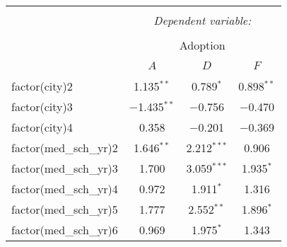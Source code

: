 \documentclass[11pt]{article}
\begin{document}
\begin{table}[!htbp] \centering 
  \caption{} 
  \label{} 
\begin{tabular}{@{\extracolsep{5pt}}lccc} 
\\[-1.8ex]\hline 
\hline \\[-1.8ex] 
 & \multicolumn{3}{c}{\textit{Dependent variable:}} \\ 
\cline{2-4} 
\\[-1.8ex] & \multicolumn{3}{c}{Adoption} \\ 
\\[-1.8ex] & $A$ & $D$ & $F$\\ 
\hline \\[-1.8ex] 
 factor(city)2 & 1.135$^{**}$ & 0.789$^{*}$ & 0.898$^{**}$ \\ 
  factor(city)3 & $-$1.435$^{**}$ & $-$0.756 & $-$0.470 \\ 
  factor(city)4 & 0.358 & $-$0.201 & $-$0.369 \\ 
  factor(med\_sch\_yr)2 & 1.646$^{**}$ & 2.212$^{***}$ & 0.906 \\ 
  factor(med\_sch\_yr)3 & 1.700 & 3.059$^{***}$ & 1.935$^{*}$ \\ 
  factor(med\_sch\_yr)4 & 0.972 & 1.911$^{*}$ & 1.316 \\ 
  factor(med\_sch\_yr)5 & 1.777 & 2.552$^{**}$ & 1.896$^{*}$ \\ 
  factor(med\_sch\_yr)6 & 0.969 & 1.975$^{*}$ & 1.343 \\ 


\end{tabular}
\end{table}
\end{document}
